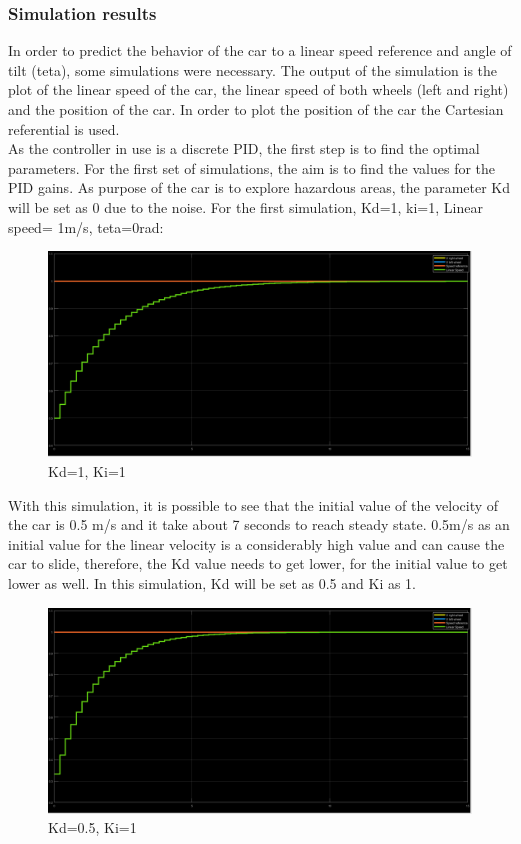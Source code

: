 \subsubsection{Simulation results}

In order to predict the behavior of the car to a linear speed reference and angle of tilt (teta), some simulations were necessary. The output of the simulation is the plot of the linear speed of the car, the linear speed of both wheels (left and right) and the position of the car.
In order to plot the position of the car the Cartesian referential is used.\\
As the controller in use is a discrete PID, the first step is to find the optimal parameters.
For the first set of simulations, the aim is to find the values for the PID gains. As purpose of the car is to explore hazardous areas, the parameter Kd will be set as 0 due to the noise. 
For the first simulation, Kd=1, ki=1, Linear speed= 1m/s, teta=0rad:
\begin{figure}[!h]
\centering
\includegraphics[width=1.0\textwidth]{./img/pid11.png}
\caption {\label{fig:pid1 - p1i1}Kd=1, Ki=1}
\end{figure}
With this simulation, it is possible to see that the initial value of the velocity of the car is 0.5 m/s and it take about 7 seconds to reach steady state. 0.5m/s as an initial value for the linear velocity is a considerably high value and can cause the car to slide, therefore, the Kd value needs to get lower, for the initial value to get lower as well.
\newpage
In this simulation, Kd will be set as 0.5 and Ki as 1.
\begin{figure}[!h]
\centering
\includegraphics[width=1.0\textwidth]{./img/pid051.png}
\caption {\label{fig:pid1 - p05i1}Kd=0.5, Ki=1}
\end{figure}
